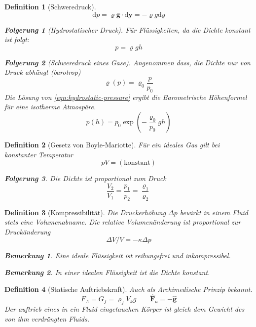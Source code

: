 \documentclass[a4paper, twocolumn]{article}
\numberwithin{equation}{section}
\theoremstyle{hsr-def}
\newtheorem{definition}{Definition}[section]
\theoremstyle{hsr-sub}
\newtheorem{result}{Folgerung}[definition]
\newtheorem{remark}{Bemerkung}[definition]
\newcommand{\dd}[1]{\ensuremath{\mathrm{d}#1}}
\renewcommand{\vec}[1]{\ensuremath{\mathbf{#1}}}
\newcommand{\uvec}[1]{\ensuremath{\vec{\hat{#1}}}}
\begin{document}
\begin{definition}[Schweredruck]
\begin{equation} \label{eqn:hydrostatic-pressure}
    \dd{p} = \varrho \vec{g} \cdot \dd{\vec{y}} = - \varrho g \dd{y}
\end{equation}

\begin{result}[Hydrostatischer Druck]
F\"ur Fl\"ussigkeiten, da die Dichte konstant ist folgt:
\[
    p = \varrho g h
\]
\end{result}

\begin{result}[Schweredruck eines Gase]
Angenommen dass, die Dichte nur von Druck abh\"angt (barotrop)
\[
    \varrho(p) = \varrho_0 \frac{p}{p_0}
\]
Die L\"osung von \eqref{eqn:hydrostatic-pressure} ergibt die \emph{Barometrische H\"ohenformel} f\"ur eine isotherme Atmosp\"are.
\[
    p(h) = p_0 \exp\left(-\frac{\varrho_0}{p_0} gh\right)
\]
\end{result}
\end{definition}

\begin{definition}[Gesetz von Boyle-Mariotte]
F\"ur ein ideales Gas gilt bei konstanter Temperatur
\[
    pV = (\text{konstant})
\]

\begin{result}
Die Dichte ist proportional zum Druck
\[
    \frac{V_2}{V_1} = \frac{p_1}{p_2} = \frac{\varrho_1}{\varrho_2}
\]
\end{result}
\end{definition}


\begin{definition}[Kompressibilit\"at]
Die Druckerh\"ohung \(\Delta p\) bewirkt in einem Fluid stets eine Volumenabname.
Die relative Volumen\"anderung ist proportional zur Druck\"anderung
\[
    \Delta V / V = - \kappa \Delta p
\]

\begin{remark}
    Eine ideale Fl\"ussigkeit ist reibungsfrei und inkompressibel.
\end{remark}

\begin{remark}
    In einer idealen Fl\"ussigkeit ist die Dichte konstant.
\end{remark}
\end{definition}

\begin{definition}[Statische Auftriebskraft] Auch als Archimedische Prinzip bekannt.
\[
    F_A = G_f = \varrho_f  V_k g
    \qquad
    \uvec{F}_a = - \uvec{g}
\]
Der auftrieb eines in ein Fluid eingetauchen K\"orper ist gleich dem Gewicht des von ihm verdr\"angten Fluids.
\end{definition}
\end{document}

